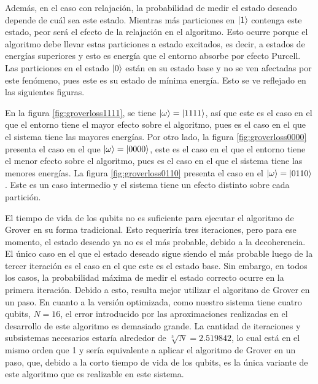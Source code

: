 Además, en el caso con relajación, la probabilidad de medir el estado deseado depende de cuál sea este estado. Mientras más particiones en $\ket{1}$ contenga este estado, peor será el efecto de la relajación en el algoritmo. Esto ocurre porque el algoritmo debe llevar estas particiones a estado excitados, es decir, a estados de energías superiores y esto es energía que el entorno absorbe por efecto Purcell. Las particiones en el estado $\ket{0}$ están en su estado base y no se ven afectadas por este fenómeno, pues este es su estado de mínima energía. Esto se ve reflejado en las siguientes figuras.

En la figura \ref{fig:groverloss1111}, se tiene $\ket{\omega} = \ket{1111}$, así que este es el caso en el que el entorno tiene el mayor efecto sobre el algoritmo, pues es el caso en el que el sistema tiene las mayores energías. Por otro lado, la figura \ref{fig:groverloss0000} presenta el caso en el que $\ket{\omega} = \ket{0000}$, este es el caso en el que el entorno tiene el menor efecto sobre el algoritmo, pues es el caso en el que el sistema tiene las menores energías. La figura \ref{fig:groverloss0110} presenta el caso en el $\ket{\omega} = \ket{0110}$. Este es un caso intermedio y el sistema tiene un efecto distinto sobre cada partición.

El tiempo de vida de los qubits no es suficiente para ejecutar el algoritmo de Grover en su forma tradicional. Esto requeriría tres iteraciones, pero para ese momento, el estado deseado ya no es el más probable, debido a la decoherencia. El único caso en el que el estado deseado sigue siendo el más probable luego de la tercer iteración es el caso en el que este es el estado base. Sin embargo, en todos los casos, la probabilidad máxima de medir el estado correcto ocurre en la primera iteración. Debido a esto, resulta mejor utilizar el algoritmo de Grover en un paso. En cuanto a la versión optimizada, como nuestro sistema tiene cuatro qubits, $N = 16$, el error introducido por las aproximaciones realizadas en el desarrollo de este algoritmo es demasiado grande. La cantidad de iteraciones y subsistemas necesarios estaría alrededor de $\sqrt[3]{N} = 2.519842$, lo cual está en el mismo orden que 1 y sería equivalente a aplicar el algoritmo de Grover en un paso, que, debido a la corto tiempo de vida de los qubits, es la única variante de este algoritmo que es realizable en este sistema.

